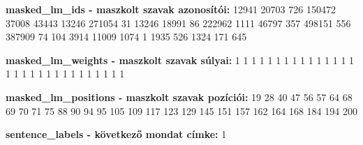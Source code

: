 \textbf{masked\_lm\_ids - maszkolt szavak azonosítói:}
12941 20703 726 150472 37008 43443 13246 271054 31 13246 18991 86 222962 1111 46797 357 498151 556 387909 74 104 3914 11009 1074 1 1935 526 1324 171 645

\textbf{masked\_lm\_weights - maszkolt szavak súlyai:}
1 1 1 1 1 1 1 1 1 1 1 1 1 1 1 1 1 1 1 1 1 1 1 1 1 1 1 1 1 1

\textbf{masked\_lm\_positions - maszkolt szavak pozíciói:}
19 28 40 47 56 57 64 68 69 70 71 75 88 90 94 95 105 109 117 123 129 145 151 157 162 164 168 184 194 200

\textbf{sentence\_labels - következő mondat címke:}
1
